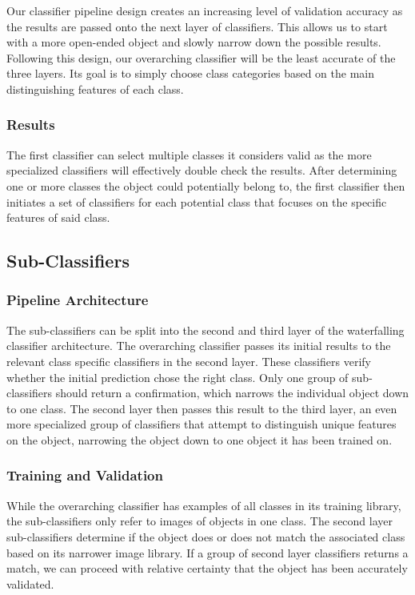 \documentclass[draftclsnofoot, onecolumn, 10pt, compsoc]{IEEEtran}
\begin{document}
				Our classifier pipeline design creates an increasing level of validation accuracy as the results are passed onto the next layer of classifiers. This allows us to start with a more open-ended object and slowly narrow down the possible results. Following this design, our overarching classifier will be the least accurate of the three layers. Its goal is to simply choose class categories based on the main distinguishing features of each class.
			
			\subsubsection{Results}
				The first classifier can select multiple classes it considers valid as the more specialized classifiers will effectively double check the results. After determining one or more classes the object could potentially belong to, the first classifier then initiates a set of classifiers for each potential class that focuses on the specific features of said class.
		
		\subsection{Sub-Classifiers}
			\subsubsection{Pipeline Architecture}
				The sub-classifiers can be split into the second and third layer of the waterfalling classifier architecture. The overarching classifier passes its initial results to the relevant class specific classifiers in the second layer. These classifiers verify whether the initial prediction chose the right class. Only one group of sub-classifiers should return a confirmation, which narrows the individual object down to one class. The second layer then passes this result to the third layer, an even more specialized group of classifiers that attempt to distinguish unique features on the object, narrowing the object down to one object it has been trained on. 
			
			\subsubsection{Training and Validation}
				While the overarching classifier has examples of all classes in its training library, the sub-classifiers only refer to images of objects in one class. The second layer sub-classifiers determine if the object does or does not match the associated class based on its narrower image library. If a group of second layer classifiers returns a match, we can proceed with relative certainty that the object has been accurately validated. 
			
\end{document}
